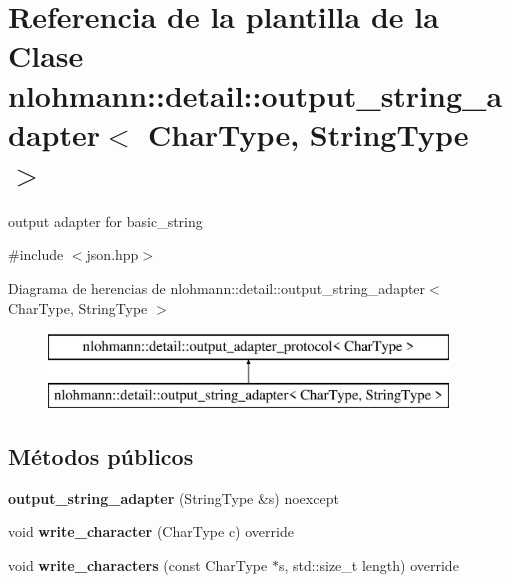 \hypertarget{classnlohmann_1_1detail_1_1output__string__adapter}{}\section{Referencia de la plantilla de la Clase nlohmann\+:\+:detail\+:\+:output\+\_\+string\+\_\+adapter$<$ Char\+Type, String\+Type $>$}
\label{classnlohmann_1_1detail_1_1output__string__adapter}


output adapter for basic\+\_\+string  




{\ttfamily \#include $<$json.\+hpp$>$}

Diagrama de herencias de nlohmann\+:\+:detail\+:\+:output\+\_\+string\+\_\+adapter$<$ Char\+Type, String\+Type $>$\begin{figure}[H]
\begin{center}
\leavevmode
\includegraphics[height=2.000000cm]{classnlohmann_1_1detail_1_1output__string__adapter}
\end{center}
\end{figure}
\subsection*{Métodos públicos}
\begin{DoxyCompactItemize}
\item 
\mbox{\label{classnlohmann_1_1detail_1_1output__string__adapter_af3a49ecd0d23fe56ac21e13d8752abc7}} 
{\bfseries output\+\_\+string\+\_\+adapter} (String\+Type \&s) noexcept
\item 
\mbox{\label{classnlohmann_1_1detail_1_1output__string__adapter_a2d76cc6c88ddbc196a63fcfcac9ee7d1}} 
void {\bfseries write\+\_\+character} (Char\+Type c) override
\item 
\mbox{\label{classnlohmann_1_1detail_1_1output__string__adapter_ab5ea4da075305d225dfd84ad997e8747}} 
void {\bfseries write\+\_\+characters} (const Char\+Type $\ast$s, std\+::size\+\_\+t length) override
\end{DoxyCompactItemize}


